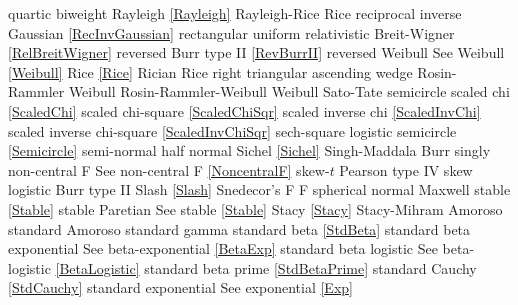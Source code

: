 quartic							\dotfill	biweight							\ncite
%
Rayleigh  						\dotfill	\eqref{Rayleigh}					\ncite	%
Rayleigh-Rice					\dotfill	Rice								\ncite
reciprocal inverse Gaussian		\dotfill	\eqref{RecInvGaussian}				\ncite
rectangular						\dotfill	uniform 							\ncite	%
relativistic Breit-Wigner		\dotfill	\eqref{RelBreitWigner}				\ncite	%
reversed Burr type II			\dotfill	\eqref{RevBurrII} 					\ncite	%
reversed Weibull				\dotfill	See Weibull \eqref{Weibull}			\ncite	%
Rice							\dotfill	\eqref{Rice}						\ncite
Rician							\dotfill	Rice								\ncite
right triangular				\dotfill	ascending wedge 					\ncite	%
Rosin-Rammler 					\dotfill	Weibull								\mcite{Rosin1933}   		%
Rosin-Rammler-Weibull 			\dotfill	Weibull								\ncite	%
%
Sato-Tate						\dotfill	semicircle 							\ncite	%
scaled chi						\dotfill	\eqref{ScaledChi}					\ncite	%
scaled chi-square 				\dotfill	\eqref{ScaledChiSqr}				\ncite	%
scaled inverse chi 				\dotfill	\eqref{ScaledInvChi}				\ncite	%
scaled inverse chi-square 		\dotfill	\eqref{ScaledInvChiSqr}				 	%
sech-square 					\dotfill	logistic							\ncite	%
semicircle						\dotfill	\eqref{Semicircle}					\ncite	%
semi-normal 					\dotfill	half normal 						\ncite	%
Sichel							\dotfill	\eqref{Sichel}						\ncite	
Singh-Maddala 					\dotfill	Burr 								\ncite	%
singly non-central F       		\dotfill	See non-central F  \eqref{NoncentralF}	\ncite 
skew-$t$						\dotfill	Pearson type IV 					\ncite	%
skew logistic					\dotfill	Burr type II 						\ncite	%
Slash							\dotfill	\eqref{Slash}						\ncite
Snedecor's F  					\dotfill	F 									\ncite	%
spherical normal				\dotfill	Maxwell								\ncite	%
stable							\dotfill	\eqref{Stable}						\ncite
stable Paretian 				\dotfill	See stable \eqref{Stable}			\ncite
Stacy 							\dotfill	\eqref{Stacy} 						\ncite	%
Stacy-Mihram					\dotfill	Amoroso								\ncite	%
standard Amoroso				\dotfill	standard gamma 						\ncite	%
standard beta					\dotfill	\eqref{StdBeta} 					\ncite	%
standard beta exponential		\dotfill	See beta-exponential \eqref{BetaExp}	\ncite	%
standard beta logistic			\dotfill	See beta-logistic \eqref{BetaLogistic}		\ncite	%
standard beta prime				\dotfill	\eqref{StdBetaPrime}				\ncite	%
standard Cauchy					\dotfill	\eqref{StdCauchy} 					\ncite	%
standard exponential			\dotfill	See exponential \eqref{Exp} 		\ncite	%
